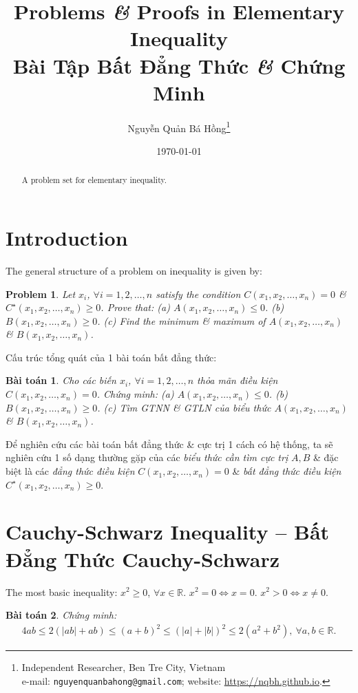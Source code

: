 \documentclass{article}
\title{Problems \textit{\&} Proofs in Elementary Inequality\\Bài Tập Bất Đẳng Thức \textit{\&} Chứng Minh}
\author{Nguyễn Quản Bá Hồng\footnote{Independent Researcher, Ben Tre City, Vietnam\\e-mail: \texttt{nguyenquanbahong@gmail.com}; website: \url{https://nqbh.github.io}.}}
\date{\today}
\newtheorem{baitoan}{Bài toán}
\newtheorem{problem}{Problem}
\begin{document}
\maketitle
\begin{abstract}
	A problem set for elementary inequality.
\end{abstract}
\tableofcontents


\section{Introduction}
The general structure of a problem on inequality is given by:

\begin{problem}
	Let $x_i$, $\forall i = 1,2,\ldots,n$ satisfy the condition $C(x_1,x_2,\ldots,x_n) = 0$ \& $C^\star(x_1,x_2,\ldots,x_n)\ge0$. Prove that: (a) $A(x_1,x_2,\ldots,x_n)\le0$. (b) $B(x_1,x_2,\ldots,x_n)\ge0$. (c) Find the minimum \& maximum of $A(x_1,x_2,\ldots,x_n)$ \& $B(x_1,x_2,\ldots,x_n)$.
\end{problem}
Cấu trúc tổng quát của 1 bài toán bất đẳng thức:

\begin{baitoan}
	Cho các biến $x_i$, $\forall i = 1,2,\ldots,n$ thỏa mãn điều kiện $C(x_1,x_2,\ldots,x_n) = 0$. Chứng minh: (a) $A(x_1,x_2,\ldots,x_n)\le0$. (b) $B(x_1,x_2,\ldots,x_n)\ge0$. (c) Tìm {\rm GTNN} \& {\rm GTLN} của biểu thức $A(x_1,x_2,\ldots,x_n)$ \& $B(x_1,x_2,\ldots,x_n)$.
\end{baitoan}
Để nghiên cứu các bài toán bất đẳng thức \& cực trị 1 cách có hệ thống, ta sẽ nghiên cứu 1 số dạng thường gặp của các \textit{biểu thức cần tìm cực trị} $A,B$ \& đặc biệt là các \textit{đẳng thức điều kiện} $C(x_1,x_2,\ldots,x_n) = 0$ \& \textit{bất đẳng thức điều kiện} $C^\star(x_1,x_2,\ldots,x_n)\ge0$.


\section{Cauchy-Schwarz Inequality -- Bất Đẳng Thức Cauchy-Schwarz}
The most basic inequality: $x^2\ge0$, $\forall x\in\mathbb{R}$. $x^2 = 0\Leftrightarrow x = 0$. $x^2 > 0\Leftrightarrow x\ne0$.

\begin{baitoan}
	Chứng minh:
	\begin{align}
		\label{1}
		4ab\le2(|ab| + ab)\le(a + b)^2\le(|a| + |b|)^2\le2(a^2 + b^2),\ \forall a,b\in\mathbb{R}.
	\end{align}
\end{baitoan}
\end{document}
